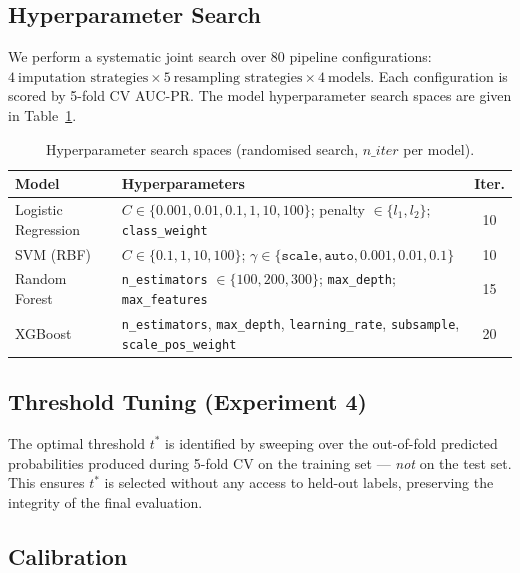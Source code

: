 \documentclass[11pt,a4paper]{article}
\begin{document}
\subsection{Hyperparameter Search}

We perform a systematic joint search over 80 pipeline configurations:
$4\ \text{imputation strategies} \times 5\ \text{resampling strategies} \times 4\ \text{models}$.
Each configuration is scored by 5-fold CV AUC-PR.
The model hyperparameter search spaces are given in Table~\ref{tab:hpspace}.

\begin{table}[H]
  \centering
  \caption{Hyperparameter search spaces (randomised search, $n\_iter$ per model).}
  \label{tab:hpspace}
  \renewcommand{\arraystretch}{1.1}
  \begin{tabular}{lp{9cm}c}
    \toprule
    \textbf{Model} & \textbf{Hyperparameters} & \textbf{Iter.} \\
    \midrule
    Logistic Regression & $C \in \{0.001,0.01,0.1,1,10,100\}$; penalty $\in \{l_1,l_2\}$; \texttt{class\_weight} & 10 \\
    SVM (RBF) & $C \in \{0.1,1,10,100\}$; $\gamma \in \{\texttt{scale}, \texttt{auto}, 0.001, 0.01, 0.1\}$ & 10 \\
    Random Forest & \texttt{n\_estimators} $\in \{100,200,300\}$; \texttt{max\_depth}; \texttt{max\_features} & 15 \\
    XGBoost & \texttt{n\_estimators}, \texttt{max\_depth}, \texttt{learning\_rate}, \texttt{subsample}, \texttt{scale\_pos\_weight} & 20 \\
    \bottomrule
  \end{tabular}
\end{table}

\subsection{Threshold Tuning (Experiment 4)}

The optimal threshold $t^*$ is identified by sweeping over the out-of-fold predicted probabilities produced during 5-fold CV on the training set — \emph{not} on the test set.
This ensures $t^*$ is selected without any access to held-out labels, preserving the integrity of the final evaluation.

\subsection{Calibration}
\end{document}
